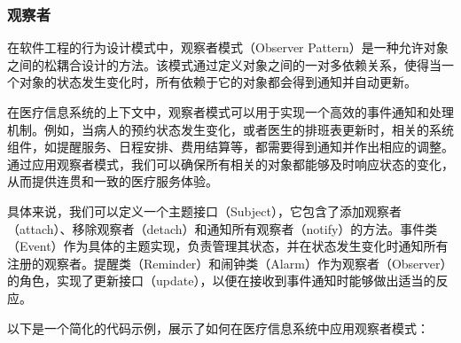 \subsubsection{观察者}
在软件工程的行为设计模式中，观察者模式（Observer Pattern）是一种允许对象之间的松耦合设计的方法。该模式通过定义对象之间的一对多依赖关系，使得当一个对象的状态发生变化时，所有依赖于它的对象都会得到通知并自动更新。

在医疗信息系统的上下文中，观察者模式可以用于实现一个高效的事件通知和处理机制。例如，当病人的预约状态发生变化，或者医生的排班表更新时，相关的系统组件，如提醒服务、日程安排、费用结算等，都需要得到通知并作出相应的调整。通过应用观察者模式，我们可以确保所有相关的对象都能够及时响应状态的变化，从而提供连贯和一致的医疗服务体验。

具体来说，我们可以定义一个主题接口（Subject），它包含了添加观察者（attach）、移除观察者（detach）和通知所有观察者（notify）的方法。事件类（Event）作为具体的主题实现，负责管理其状态，并在状态发生变化时通知所有注册的观察者。提醒类（Reminder）和闹钟类（Alarm）作为观察者（Observer）的角色，实现了更新接口（update），以便在接收到事件通知时能够做出适当的反应。

以下是一个简化的代码示例，展示了如何在医疗信息系统中应用观察者模式：

